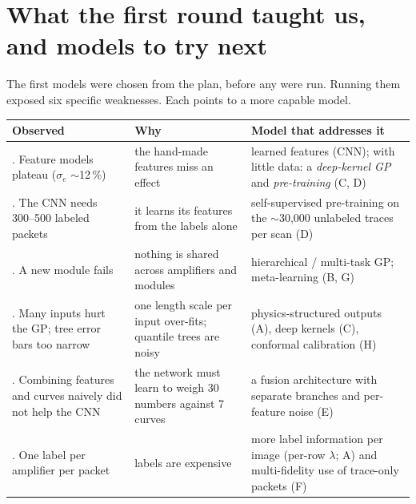 \documentclass[10pt]{article}
\begin{document}
\section{What the first round taught us, and models to try next}
\label{sec:next}

The first models were chosen from the plan, before any were run. Running them exposed six specific weaknesses. Each points to a more
capable model.

\begin{table}[H]
\centering
\small
\begin{tabularx}{\textwidth}{>{\raggedright\arraybackslash}p{4.3cm}>{\raggedright\arraybackslash}p{4.4cm}X}
\toprule
Observed & Why & Model that addresses it \\
\midrule
1. Feature models plateau ($\sigma_e$ $\sim$12\,\%) & the hand-made features miss an effect & learned features (CNN); with little data: a \emph{deep-kernel GP} and \emph{pre-training} (C, D) \\
2. The CNN needs 300--500 labeled packets & it learns its features from the labels alone & self-supervised pre-training on the $\sim$30{,}000 unlabeled traces per scan (D) \\
3. A new module fails & nothing is shared across amplifiers and modules & hierarchical / multi-task GP; meta-learning (B, G) \\
4. Many inputs hurt the GP; tree error bars too narrow & one length scale per input over-fits; quantile trees are noisy & physics-structured outputs (A), deep kernels (C), conformal calibration (H) \\
5. Combining features and curves naively did not help the CNN & the network must learn to weigh 30 numbers against 7 curves & a fusion architecture with separate branches and per-feature noise (E) \\
6. One label per amplifier per packet & labels are expensive & more label information per image (per-row $\lambda$; A) and multi-fidelity use of trace-only packets (F) \\
\bottomrule
\end{tabularx}
\end{table}
\end{document}
